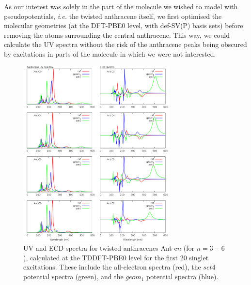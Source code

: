 \documentclass[aip,reprint,nofootinbib]{revtex4-1}
\begin{document}
As our interest was solely in the part of the molecule we wished to model with pseudopotentials, \emph{i.e.} the twisted anthracene itself, we first optimised the molecular geometries (at the DFT-PBE0 level, with def-SV(P) basis sets) before removing the atoms surrounding the central anthracene. This way, we could calculate the UV spectra without the risk of the anthracene peaks being obscured by excitations in parts of the molecule in which we were not interested.

\begin{figure}
\begin{center}
\includegraphics[width=8cm]{twistacene_spectra}
\end{center}
\caption[Twistacene all-electron and pseudopotential spectra.]{UV and ECD spectra for twisted anthracenes Ant-c$n$ (for $n=3-6$), calculated at the TDDFT-PBE0 level for the first 20 singlet excitations. These include the all-electron spectra (red), the $set4$ potential spectra (green), and the $geom_1$ potential spectra (blue).}\label{fig:antc_spectra}
\end{figure}
\end{document}
